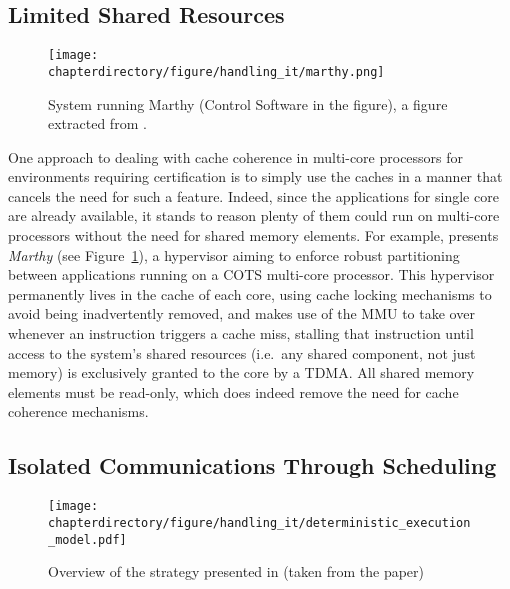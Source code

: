 \subsection{Limited Shared Resources}
\begin{figure}
\centering
\texttt{[image: \\chapterdirectory/figure/handling\_it/marthy.png]}
\caption{%
System running Marthy (Control Software in the figure), a figure extracted from
\cite{7311481}.
}
\label{fig:handling_it:marthy}
\end{figure}

One approach to dealing with cache coherence in multi-core processors for
environments requiring certification is to simply use the caches in a manner
that cancels the need for such a feature. Indeed, since the applications for
single core are already available, it stands to reason plenty of them could run
on multi-core processors without the need for shared memory elements. For
example, \cite{jean:tel-01341758} presents \textit{Marthy} (see
Figure~\ref{fig:handling_it:marthy}), a hypervisor aiming to enforce robust
partitioning between applications running on a COTS multi-core processor. This
hypervisor permanently lives in the cache of each core, using cache locking
mechanisms to avoid being inadvertently removed, and makes use of the MMU to
take over whenever an instruction triggers a cache miss, stalling that
instruction until access to the system's shared resources (i.e.~any shared
component, not just memory) is exclusively granted to the core by a TDMA. All
shared memory elements must be read-only, which does indeed remove the need for
cache coherence mechanisms.

\stopallthesefloats

\subsection{Isolated Communications Through Scheduling}
\begin{figure}
\centering
\texttt{[image: \\chapterdirectory/figure/handling\_it/deterministic\_execution\_model.pdf]}
\caption{%
Overview of the strategy presented in \cite{10.1007/978-3-642-28293-5_9} (taken
from the paper)
}
\label{fig:handling_it:deterministic_execution_model}
\end{figure}

